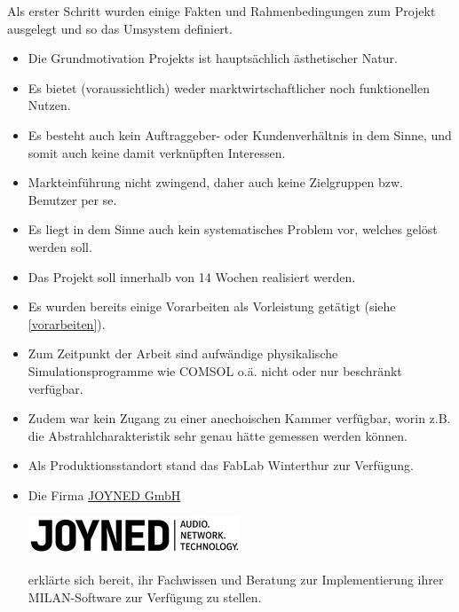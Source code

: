 Als erster Schritt wurden einige Fakten und Rahmenbedingungen zum Projekt ausgelegt und so das Umsystem definiert.
\begin{itemize}
	\item Die Grundmotivation Projekts ist hauptsächlich ästhetischer Natur.
	\item Es bietet (voraussichtlich) weder marktwirtschaftlicher noch funktionellen Nutzen.
	\item Es besteht auch kein Auftraggeber- oder Kundenverhältnis in dem Sinne, und somit auch keine damit verknüpften Interessen.
	\item Markteinführung nicht zwingend, daher auch keine Zielgruppen bzw. Benutzer per se.
	\item Es liegt in dem Sinne auch kein systematisches Problem vor, welches gelöst werden soll.
	\item Das Projekt soll innerhalb von 14 Wochen realisiert werden.
	\item Es wurden bereits einige Vorarbeiten als Vorleistung getätigt (siehe \ref{vorarbeiten}).
	\item Zum Zeitpunkt der Arbeit sind aufwändige physikalische Simulationsprogramme wie COMSOL o.ä. nicht oder nur beschränkt verfügbar.
	\item Zudem war kein Zugang zu einer anechoischen Kammer verfügbar, worin z.B. die Abstrahlcharakteristik sehr genau hätte gemessen werden können.
	\item Als Produktionsstandort stand das FabLab Winterthur zur Verfügung.
	\item Die Firma \href{https://www.joyned.at/}{JOYNED GmbH} \begin{minipage}{3cm}
		\vspace{-1mm}
		\includegraphics[scale=1.5]{pictures/joyned_logo.png}
	\end{minipage} erklärte sich bereit, ihr Fachwissen und Beratung zur Implementierung ihrer MILAN-Software zur Verfügung zu stellen.
\end{itemize}
